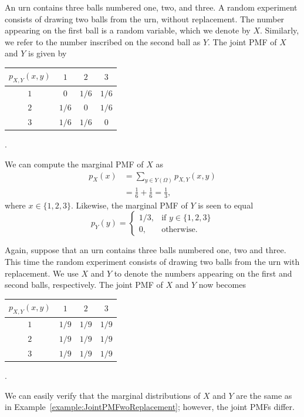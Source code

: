\begin{example} \label{example:JointPMFwoReplacement}
An urn contains three balls numbered one, two, and three.
A random experiment consists of drawing two balls from the urn, without replacement.
The number appearing on the first ball is a random variable, which we denote by $X$.
Similarly, we refer to the number inscribed on the second ball as $Y$.
The joint PMF of $X$ and $Y$ is given by
\begin{center}
\begin{tabular}{|c|c|c|c|}
\hline
$p_{X,Y} (x,y)$ & $1$ & $2$ & $3$ \\
\hline
$1$ & $0$ & $1/6$ & $1/6$ \\
\hline
$2$ & $1/6$ & $0$ & $1/6$ \\
\hline
$3$ & $1/6$ & $1/6$ & $0$ \\
\hline
\end{tabular} .
\end{center}
We can compute the marginal PMF of $X$ as
\begin{equation*}
\begin{split}
p_X (x) &= \sum_{y \in Y(\Omega)} p_{X,Y} (x,y) \\
&= \frac{1}{6} + \frac{1}{6} = \frac{1}{3},
\end{split}
\end{equation*}
where $x \in \{1, 2, 3 \}$.
Likewise, the marginal PMF of $Y$ is seen to equal
\begin{equation*}
p_Y (y) = \left\{ \begin{array}{ll}
1/3, & \text{if }y \in \{ 1, 2, 3 \} \\
0, & \text{otherwise} .
\end{array} \right.
\end{equation*}
\end{example}

\begin{example} \label{example:JointPMFwithReplacement}
Again, suppose that an urn contains three balls numbered one, two and three.
This time the random experiment consists of drawing two balls from the urn with replacement.
We use $X$ and $Y$ to denote the numbers appearing on the first and second balls, respectively.
The joint PMF of $X$ and $Y$ now becomes
\begin{center}
\begin{tabular}{|c|c|c|c|}
\hline
$p_{X,Y} (x,y)$ & $1$ & $2$ & $3$ \\
\hline
$1$ & $1/9$ & $1/9$ & $1/9$ \\
\hline
$2$ & $1/9$ & $1/9$ & $1/9$ \\
\hline
$3$ & $1/9$ & $1/9$ & $1/9$ \\
\hline
\end{tabular} .
\end{center}
We can easily verify that the marginal distributions of $X$ and $Y$ are the same as in Example~\ref{example:JointPMFwoReplacement};
however, the joint PMFs differ.
\end{example}


